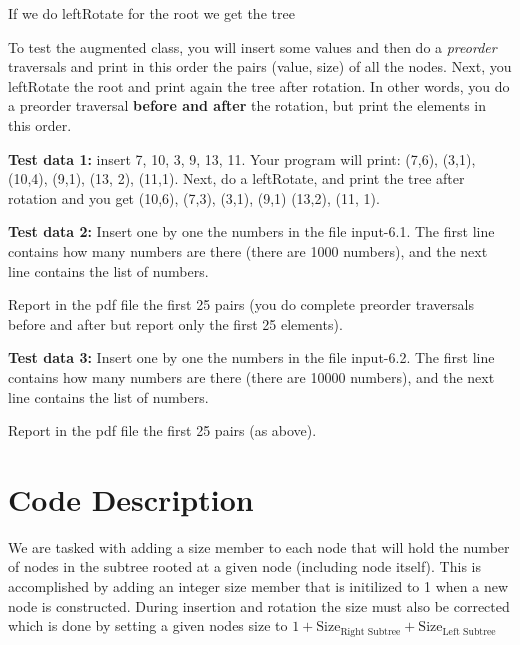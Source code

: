 \documentclass[11pt]{article}
\begin{document}
If we do \textsf{leftRotate} for the root we get the tree


To test the augmented class, you will insert some values and then do a \emph{preorder} traversals and print in this order  the pairs (value, size) of all the nodes. 	Next, you \textsf{leftRotate} the root and print again the tree after rotation. In other words, you do a preorder traversal \textbf{before and after} the rotation, but print the elements in this order.

\textbf{Test data 1:} insert 7, 10, 3, 9, 13, 11. Your program will print: (7,6), (3,1), (10,4), (9,1), (13, 2), (11,1).
Next, do a \textsf{leftRotate}, and print the tree after rotation and you get (10,6), (7,3), (3,1), (9,1) (13,2), (11, 1).




\textbf{Test data 2:}  Insert one by one the numbers in the file input-6.1. The first line contains how many numbers are there (there are 1000 numbers), and the next line contains the list of numbers.

Report in the pdf file the first 25 pairs (you do complete preorder traversals before and after but report only the first 25 elements).

\textbf{Test data 3:} Insert one by one the numbers in the file input-6.2. The first line contains how many numbers are there (there are 10000 numbers), and the next line contains the list of numbers.

Report in the pdf file the first 25 pairs (as above).

\pagebreak
\section*{Code Description}
    We are tasked with adding a size member to each node that will hold the number of nodes in the subtree rooted at a given node (including node itself). This is accomplished by adding an integer size member that is initilized to 1 when a new node is constructed. During insertion and rotation the size must also be corrected which is done by setting a given nodes size to  $1 + \text{Size}_\text{Right Subtree} + \text{Size}_\text{Left Subtree}$
\end{document}
